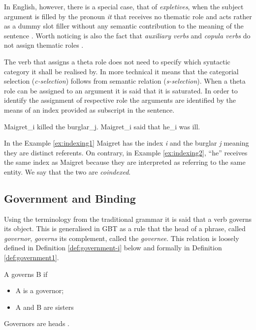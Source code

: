 In English, however, there is a special case, that of \textit{expletives}, when the subject argument is filled by the pronoun \textit{it} that receives no thematic role and acts rather as a dummy slot filler without any semantic contribution to the meaning of the sentence \citep[62]{Haegeman1991}. Worth noticing is also the fact that \textit{auxiliary verbs} and \textit{copula verbs} do not assign thematic roles \citep{pollock1989verb}. 

The verb that assigns a theta role does not need to specify which syntactic category it shall be realised by. In more technical it means that the categorial selection (\textit{c-selection}) follows from semantic relation (\textit{s-selection}). When a theta role can be assigned to an argument it is said that it is saturated. In order to identify the assignment of respective role the arguments are identified by the means of an index provided as subscript in the sentence. 

\begin{exe}
    \ex\label{ex:indexing1} Maigret_i killed the burglar_j.
    \ex\label{ex:indexing2} Maigret_i said that he_i was ill.
\end{exe}

In the Example \ref{ex:indexing1} Maigret has the index \textit{i} and the burglar \textit{j} meaning they are distinct referents. On contrary, in Example \ref{ex:indexing2}, ``he'' receives the same index as Maigret because they are interpreted as referring to the same entity. We say that the two are \textit{coindexed}.

\subsection{Government and Binding}

Using the terminology from the traditional grammar it is said that a verb governs its object. This is generalised in GBT as a rule that the head of a phrase, called \textit{governor}, \textit{governs} its complement, called the \textit{governee}. This relation is loosely defined in Definition \ref{def:government-i} below and formally in Definition \ref{def:government1}. 

\begin{definition}[government i]\label{def:government-i}
     A governs B if 
     \begin{itemize}
         \item A is a governor;
         \item A and B are sisters
     \end{itemize}
     Governors are heads \citep[86]{Haegeman1991}.
\end{definition}

